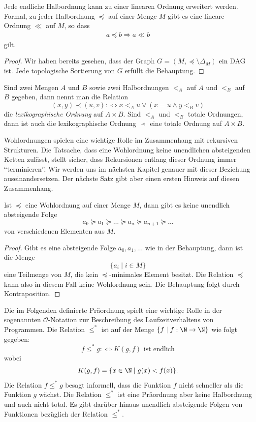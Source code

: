 \begin{cor}
    Jede endliche Halbordnung kann zu einer linearen Ordnung erweitert werden. Formal, zu jeder Halbordnung $\preceq$ auf einer Menge $M$ gibt es eine lineare Ordnung $\ll$ auf $M$, so dass
    \begin{align*}
    a\preceq b \Rightarrow a\ll b
    \end{align*}
    gilt.
\end{cor}
\begin{proof}
    Wir haben bereits gesehen, dass der Graph $G=(M,\preceq\setminus\Delta_M)$ ein DAG ist. Jede topologische Sortierung von $G$ erfüllt die Behauptung.
\end{proof}

\begin{rk}
Sind zwei Mengen $A$ und $B$ sowie zwei Halbordnungen $<_A$ auf $A$ und $<_B$ auf $B$ gegeben, dann nennt man die Relation
\[
(x,y)\prec (u,v):\Leftrightarrow x<_A u\lor (x=u\land y<_Bv)
\]
die \textit{lexikographische Ordnung} auf $A\times B$. Sind $<_A$ und $<_B$ totale Ordnungen, dann ist auch die lexikographische Ordnung $\prec$ eine totale Ordnung auf $A\times B$.
\end{rk}


\begin{rk}
Wohlordnungen spielen eine wichtige Rolle im Zusammenhang mit rekursiven Strukturen. Die Tatsache, dass eine Wohlordnung keine unendlichen absteigenden Ketten zulässt, stellt sicher, dass Rekursionen entlang dieser Ordnung immer ``terminieren''. Wir werden uns im nächsten Kapitel genauer mit dieser Beziehung auseinandersetzen. Der nächste Satz gibt aber einen ersten Hinweis auf diesen Zusammenhang.
\end{rk}

\begin{satz}
Ist $\preceq$ eine Wohlordnung auf einer Menge $M$, dann gibt es keine unendlich absteigende Folge
\[
a_0\succeq a_1\succeq\dots\succeq a_n\succeq a_{n+1}\succeq\dots
\]
von verschiedenen Elementen aus $M$.
\end{satz}
\begin{proof}
Gibt es eine absteigende Folge $a_0,a_1,\dots$ wie in der Behauptung, dann ist die Menge
\[
\{a_i\mid i\in M\}
\]
eine Teilmenge von $M$, die kein $\preceq$-minimales Element besitzt. Die Relation $\preceq$ kann also in diesem Fall keine Wohlordnung sein. Die Behauptung folgt durch Kontraposition.
\end{proof}

\begin{bsp}
Die im Folgenden definierte Präordnung spielt eine wichtige Rolle in der sogenannten $\mathcal{O}$-Notation zur Beschreibung des Laufzeitverhaltens von Programmen. Die Relation $\leq^*$ ist auf der Menge $\{f\mid f:\N\to\N \}$ wie folgt gegeben:
\[
f\leq^* g:\Leftrightarrow K(g,f)\text{ ist endlich}
\]
wobei
\[
K(g,f)=\{x\in \N\mid g(x)<f(x) \}.
\]
Die Relation $f\leq^* g$ besagt informell, dass die Funktion $f$ nicht schneller als die Funktion $g$ wächst. Die Relation $\leq^*$ ist eine Präordnung aber keine Halbordnung und auch nicht total. Es gibt darüber hinaus unendlich absteigende Folgen von Funktionen bezüglich der Relation $\leq^*$.
\end{bsp}


